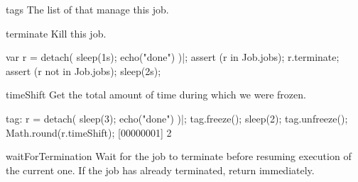\begin{urbiscriptapi}
\item[tags] The list of  that manage this job.


\item[terminate]  Kill this job.
\begin{urbiscript}
var r = detach({ sleep(1s); echo("done") })|;
assert (r in Job.jobs);
r.terminate;
assert (r not in Job.jobs);
sleep(2s);
\end{urbiscript}


\item[timeShift]
  Get the total amount of time during which we were frozen.
\begin{urbiscript}
tag: r = detach({ sleep(3); echo("done") })|;
tag.freeze();
sleep(2);
tag.unfreeze();
Math.round(r.timeShift);
[00000001] 2
\end{urbiscript}


\item[waitForTermination] Wait for the job to terminate before resuming
  execution of the current one.  If the job has already terminated, return
  immediately.
\end{urbiscriptapi}


